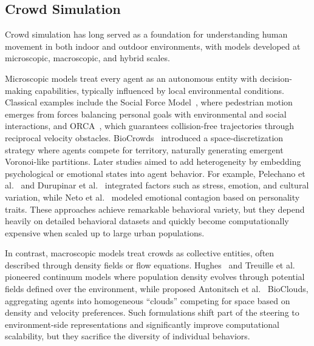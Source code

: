 \documentclass[pdflatex,sn-mathphys-num]{sn-jnl}%
\newcommand\redb[1]{#1}
\newcommand\blue[1]{#1}
\theoremstyle{thmstyleone}%
\theoremstyle{thmstyletwo}%
\theoremstyle{thmstylethree}%
\begin{document}
\subsection{Crowd Simulation}
\label{related:crowd_simulation}
\blue{
Crowd simulation has long served as a foundation for understanding human movement in both indoor and outdoor environments, with models developed at microscopic, macroscopic, and hybrid scales.

Microscopic models treat every agent as an autonomous entity with decision-making capabilities\redb{, typically influenced by local environmental conditions}. Classical examples include the Social Force Model~\citep{helbing1995social}, where pedestrian motion emerges from forces balancing personal goals with environmental and social interactions, and ORCA~\citep{van2011reciprocal}, which guarantees collision-free trajectories through reciprocal velocity obstacles. BioCrowds~\citep{de2012simulating} introduced a space-discretization strategy where agents compete for territory, naturally generating emergent Voronoi-like partitions. Later studies aimed to add heterogeneity by embedding psychological or emotional states into agent behavior. For example, Pelechano et al.~\citep{pelechano2005crowd} and Durupinar et al.~\citep{durupinar2015psychological} integrated factors such as stress, emotion, and cultural variation, while Neto et al.~\citep{neto2017giving} modeled emotional contagion based on personality traits. These approaches achieve remarkable behavioral variety, but they depend heavily on detailed behavioral datasets and quickly become computationally expensive when scaled up to large urban populations.

In contrast, macroscopic models treat crowds as collective entities, often described through density fields or flow equations. Hughes~\citep{hughes2002continuum} and Treuille et al.~\citep{treuille2006continuum} pioneered continuum models where population density evolves through potential fields\redb{ defined over the environment, while proposed Antonitsch et al.~\citep{antonitsch2019bioclouds} BioClouds,
aggregating agents into homogeneous “clouds” competing for space based on density
and velocity preferences. Such formulations shift
part of the steering to environment-side representations and significantly improve computational scalability,} but they sacrifice the diversity of individual behaviors.

}
\end{document}
